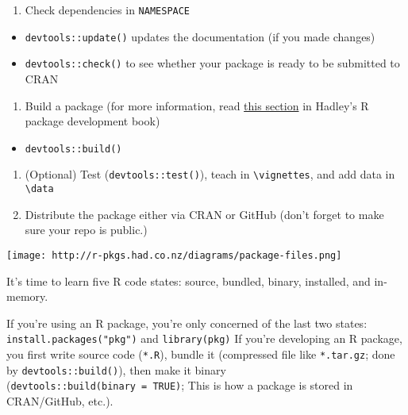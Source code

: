 \documentclass[
]{book}
\providecommand{\tightlist}{%
  \setlength{\itemsep}{0pt}\setlength{\parskip}{0pt}}
\begin{document}
\begin{enumerate}
\def\labelenumi{\arabic{enumi}.}
\setcounter{enumi}{5}
\tightlist
\item
  Check dependencies in \texttt{NAMESPACE}
\end{enumerate}

\begin{itemize}
\tightlist
\item
  \texttt{devtools::update()} updates the documentation (if you made changes)
\item
  \texttt{devtools::check()} to see whether your package is ready to be submitted to CRAN
\end{itemize}

\begin{enumerate}
\def\labelenumi{\arabic{enumi}.}
\setcounter{enumi}{6}
\tightlist
\item
  Build a package (for more information, read \href{http://r-pkgs.had.co.nz/package.html}{this section} in Hadley's R package development book)
\end{enumerate}

\begin{itemize}
\tightlist
\item
  \texttt{devtools::build()}
\end{itemize}

\begin{enumerate}
\def\labelenumi{\arabic{enumi}.}
\setcounter{enumi}{7}
\tightlist
\item
  (Optional) Test (\texttt{devtools::test()}), teach in \texttt{\textbackslash{}vignettes}, and add data in \texttt{\textbackslash{}data}
\item
  Distribute the package either via CRAN or GitHub (don't forget to make sure your repo is public.)
\end{enumerate}

\texttt{[image: http://r-pkgs.had.co.nz/diagrams/package-files.png]}

It's time to learn five R code states: source, bundled, binary, installed, and in-memory.

If you're using an R package, you're only concerned of the last two states: \texttt{install.packages("pkg")} and \texttt{library(pkg)} If you're developing an R package, you first write source code (\texttt{*.R}), bundle it (compressed file like \texttt{*.tar.gz}; done by \texttt{devtools::build()}), then make it binary (\texttt{devtools::build(binary\ =\ TRUE)}; This is how a package is stored in CRAN/GitHub, etc.).
\end{document}
